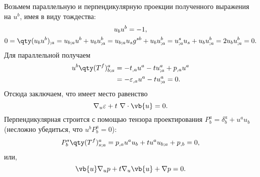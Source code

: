 \documentclass[\docroot/reports/draft/report.tex]{subfiles}
\begin{document}
    Возьмем параллельную и перпендикулярную проекции полученного выражения на $u^b$, имея в виду тождества:
    \begin{gather*}
        u_b u^b = -1 , \\
        0 = \qty(u_b u^b)_{;a} = u_{b;a} u^b + u_b u^b_{;a}
          = u_{b;a} u_s g^{sb} + u_b u^b_{;a}
          = u^s_{;a} u_s + u_b u^b_{;a}
          = 2 u_b u^b_{;a}
          = 0 .
    \end{gather*}
    Для параллельной получаем
    \begin{equation*}\begin{aligned}
        u^b \qty(T^f)^a_{b;a} &= - t_{,a} u^a - t u^a_{;a} + p_{,a} u^a \\
                              &= - \varepsilon_{,a} u^a - t u^a_{;a} = 0 .
    \end{aligned}\end{equation*}
    Отсюда заключаем, что имеет место равенство
    \begin{equation}
        \nabla_u \varepsilon + t\ \nabla \cdot \vb{u} = 0 .
    \end{equation}
    Перпендикулярная строится с помощью тензора проектирования $P^a_b = \delta^a_b + u^a u_b$ (несложно убедиться, что $u^b P^a_b = 0$):
    \begin{equation*}\begin{aligned}
        P^s_b \qty(T^f)^a_{s;a} = p_{,a} u^a u_b + t u^a u_{b;a} + p_{,b} = 0 ,
    \end{aligned}\end{equation*}
    или,
    \begin{equation}
        \vb{u} \nabla_u p + t \nabla_u \vb{u} + \nabla p = 0 .
    \end{equation}
\end{document}
